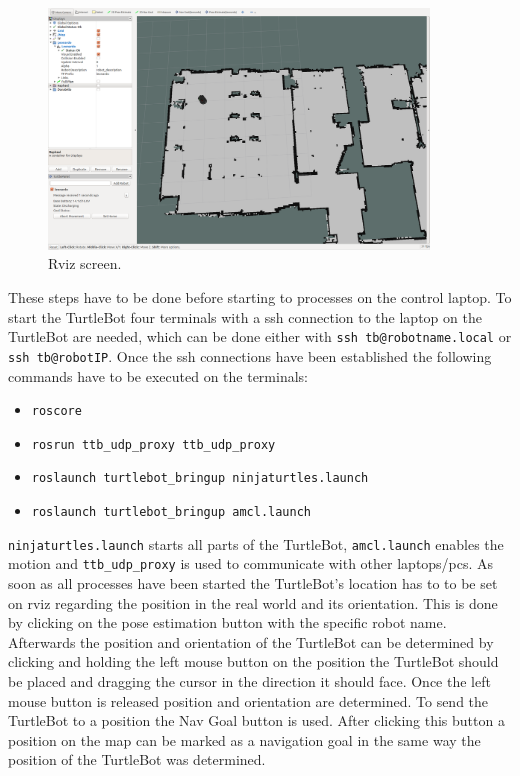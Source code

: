\begin{figure}[htbp]
	\centering
	\includegraphics[width=0.9\textwidth]{pic/rviz.png}
	\caption{Rviz screen.}
	\label{fig:rviz}
\end{figure}
These steps have to be done before starting to processes on the control laptop.
To start the TurtleBot four terminals with a ssh connection to the laptop on the TurtleBot are needed, which can be done either with \verb#ssh tb@robotname.local# or \verb#ssh tb@robotIP#. Once the ssh connections have been established the following commands have to be executed on the terminals:
\begin{itemize}
	\item \verb#roscore#
	\item \verb#rosrun ttb_udp_proxy ttb_udp_proxy#
	\item \verb#roslaunch turtlebot_bringup ninjaturtles.launch#
	\item \verb#roslaunch turtlebot_bringup amcl.launch#
	\end{itemize}
\verb#ninjaturtles.launch# starts all parts of the TurtleBot, \verb#amcl.launch# enables the motion and \verb#ttb_udp_proxy# is used to communicate with other laptops/pcs.
As soon as all processes have been started the TurtleBot's location has to to be set on rviz regarding the position in the real world and its orientation.
This is done by clicking on the pose estimation button with the specific robot name. Afterwards the position and orientation of the TurtleBot can be determined by clicking and holding the left mouse button on the position the TurtleBot should be placed and dragging the cursor in the direction it should face. Once the left mouse button is released position and orientation are determined. To send the TurtleBot to a position the Nav Goal button is used. After clicking this button a position on the map can be marked as a navigation goal in the same way the position of the TurtleBot was determined.   

